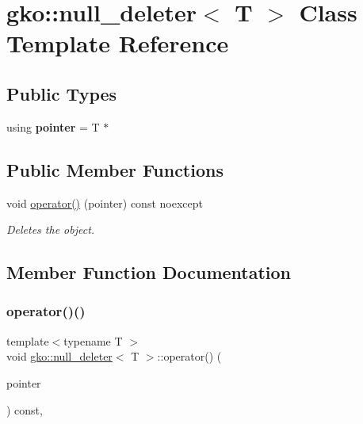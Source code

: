 \hypertarget{classgko_1_1null__deleter}{}\section{gko\+:\+:null\+\_\+deleter$<$ T $>$ Class Template Reference}
\label{classgko_1_1null__deleter}
\subsection*{Public Types}
\begin{DoxyCompactItemize}
\item 
\mbox{\label{classgko_1_1null__deleter_a07da79e3ea35a385173550a451b59bcf}} 
using {\bfseries pointer} = T $\ast$
\end{DoxyCompactItemize}
\subsection*{Public Member Functions}
\begin{DoxyCompactItemize}
\item 
void \hyperlink{classgko_1_1null__deleter_a09fc153e500a30edaa572f2c6cb674ab}{operator()} (pointer) const noexcept
\begin{DoxyCompactList}\small\item\em Deletes the object. \end{DoxyCompactList}\end{DoxyCompactItemize}


\subsection{Member Function Documentation}
\mbox{\label{classgko_1_1null__deleter_a09fc153e500a30edaa572f2c6cb674ab}} 
\subsubsection{\texorpdfstring{operator()()}{operator()()}}
{\footnotesize\ttfamily template$<$typename T $>$ \\
void \hyperlink{classgko_1_1null__deleter}{gko\+::null\+\_\+deleter}$<$ T $>$\+::operator() (\begin{DoxyParamCaption}\item[{pointer}]{ }\end{DoxyParamCaption}) const\hspace{0.3cm}{\ttfamily [inline]}, {\ttfamily [noexcept]}}



